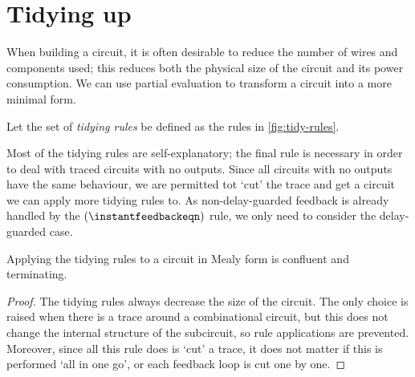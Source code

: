 \section{Tidying up}

When building a circuit, it is often desirable to reduce the number of wires
and components used; this reduces both the physical size of the circuit and its
power consumption.
We can use partial evaluation to transform a circuit into a more minimal form.

\begin{definition}
    Let the set of \emph{tidying rules} be defined as the rules in
    \cref{fig:tidy-rules}.
\end{definition}

Most of the tidying rules are self-explanatory; the final rule is necessary in
order to deal with traced circuits with no outputs.
Since all circuits with no outputs have the same behaviour, we are permitted tot
`cut' the trace and get a circuit we can apply more tidying rules to.
As non-delay-guarded feedback is already handled by the
\((\instantfeedbackeqn)\) rule, we only need to consider the delay-guarded case.



\begin{proposition}
    Applying the tidying rules to a circuit in Mealy form is confluent and
    terminating.
\end{proposition}
\begin{proof}
    The tidying rules always decrease the size of the circuit.
    The only choice is raised when there is a trace around a combinational
    circuit, but this does not change the internal structure of the subcircuit,
    so rule applications are prevented.
    Moreover, since all this rule does is `cut' a trace, it does not matter if
    this is performed `all in one go', or each feedback loop is cut one by one.
\end{proof}